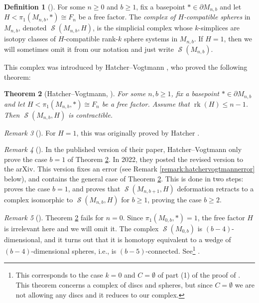 \documentclass[11pt]{amsart}
\numberwithin{equation}{section}
\theoremstyle{plain}
\newtheorem{theorem}{Theorem}[section]
\theoremstyle{definition}
\newtheorem{defn}[theorem]{Definition}
\newenvironment{definition}[1][]{\begin{defn}[#1]\pushQED{\qed}}{\popQED \end{defn}}
\theoremstyle{remark}
\newtheorem{rmk}[theorem]{Remark}
\newenvironment{remark}[1][]{\begin{rmk}[#1] \pushQED{\qed}}{\popQED \end{rmk}}
\DeclareMathOperator{\rank}{rk}
\DeclareMathOperator{\Spheres}{\mathcal{S}}
\begin{document}
\begin{definition}
For some $n \geq 0$ and $b \geq 1$, fix a basepoint $\ast \in \partial M_{n,b}$ 
and let $H < \pi_1(M_{n,b},\ast) \cong F_n$ be a free factor.  The {\em complex of
$H$-compatible spheres} in $M_{n,b}$, denoted $\Spheres(M_{n,b},H)$, is the simplicial
complex whose $k$-simplices are isotopy classes of $H$-compatible rank-$k$ sphere systems
in $M_{n,b}$.  If $H = 1$, then we will sometimes omit it from our notation and just
write $\Spheres(M_{n,b})$.
\end{definition}

This complex was introduced by Hatcher--Vogtmann \cite{HatcherVogtmann, HatcherVogtmannRevised}, who proved
the following theorem:

\begin{theorem}[{Hatcher--Vogtmann, \cite{HatcherVogtmannRevised}}]
\label{theorem:spherescon}
For some $n,b \geq 1$, fix a basepoint $\ast \in \partial M_{n,b}$ 
and let $H < \pi_1(M_{n,b},\ast) \cong F_n$ be a free factor.  Assume
that $\rank(H) \leq n-1$.  Then $\Spheres(M_{n,b},H)$ is contractible.
\end{theorem}

\begin{remark}
For $H = 1$, this was originally proved by Hatcher \cite{HatcherStabilization}.
\end{remark}

\begin{remark}
\label{remark:onlyone}
In the published version \cite{HatcherVogtmann} of their paper, Hatcher--Vogtmann only prove the case $b=1$ of
Theorem \ref{theorem:spherescon}.  In 2022, they posted the revised version \cite{HatcherVogtmannRevised}
to the arXiv.  This version fixes an error (see Remark \ref{remark:hatchervogtmannerror} below), and
contains the general case of Theorem \ref{theorem:spherescon}.  This is done in two steps:
\cite[Theorem 2.1]{HatcherVogtmannRevised} proves the case $b=1$, and \cite[Lemma 2.3]{HatcherVogtmannRevised}
proves that $\Spheres(M_{n,b+1},H)$ deformation retracts to a complex isomorphic to $\Spheres(M_{n,b},H)$
for $b \geq 1$, proving the case $b \geq 2$.
\end{remark}

\begin{remark}
\label{remark:genuszero}
Theorem \ref{theorem:spherescon} fails for $n=0$.  Since $\pi_1(M_{0,b},\ast) = 1$, the free factor $H$ is irrelevant here and we
will omit it.  The complex $\Spheres(M_{0,b})$ is $(b-4)$-dimensional, and it turns out that it
is homotopy equivalent to a wedge of $(b-4)$-dimensional spheres, i.e., is $(b-5)$-connected.
See\footnote{This corresponds to the case $k=0$ and $C = \emptyset$ of part (1) of the proof
of \cite[Theorem 3.1]{HatcherWahlBoundaries}.  This theorem concerns a complex of discs and spheres,
but since $C = \emptyset$ we are not allowing any discs and it reduces to our complex.}
\cite[proof of Theorem 3.1]{HatcherWahlBoundaries}.
\end{remark}
\end{document}
